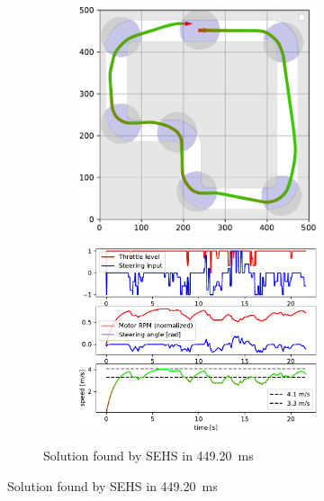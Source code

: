 \begin{figure}[!tbp]
	\vspace{0.75cm}
	
	\begin{subfigure}[t]{\textwidth}
		\begin{subfigure}[c]{0.49\textwidth}
			\includegraphics[width=\textwidth]{../img/experiments/simple_sehs_trajectory}
		\end{subfigure}
		\hfill
		\begin{subfigure}[c]{0.49\textwidth}
			\includegraphics[width=\textwidth]{../img/experiments/simple_sehs_actuators}
		\end{subfigure}
		\caption{Solution found by SEHS in \SI{449.20}{\milli\second}}
		\label{fig:simple-sehs}
	\end{subfigure}
	

\end{figure}
